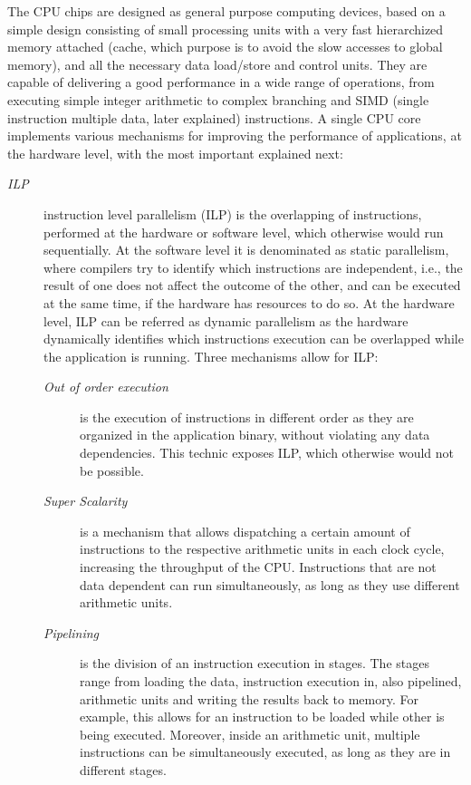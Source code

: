 The CPU chips are designed as general purpose computing devices, based on a simple design consisting of small processing units with a very fast hierarchized memory attached (cache, which purpose is to avoid the slow accesses to global memory), and all the necessary data load/store and control units. They are capable of delivering a good performance in a wide range of operations, from executing simple integer arithmetic to complex branching and SIMD (single instruction multiple data, later explained) instructions. A single CPU core implements various mechanisms for improving the performance of applications, at the hardware level, with the most important explained next:

\begin{description}
	\item[\textit{ILP}] instruction level parallelism (ILP) is the overlapping of instructions, performed at the hardware or software level, which otherwise would run sequentially. At the software level it is denominated as static parallelism, where compilers try to identify which instructions are independent, i.e., the result of one does not affect the outcome of the other, and can be executed at the same time, if the hardware has resources to do so. At the hardware level, ILP can be referred as dynamic parallelism as the hardware dynamically identifies which instructions execution can be overlapped while the application is running. Three mechanisms allow for ILP:
	\begin{description}
		\item[\textit{Out of order execution}] is the execution of instructions in different order as they are organized in the application binary, without violating any data dependencies. This technic exposes ILP, which otherwise would not be possible.
		\item[\textit{Super Scalarity}] is a mechanism that allows dispatching a certain amount of instructions to the respective arithmetic units in each clock cycle, increasing the throughput of the CPU. Instructions that are not data dependent can run simultaneously, as long as they use different arithmetic units.
		\item[\textit{Pipelining}] is the division of an instruction execution in stages. The stages range from loading the data, instruction execution in, also pipelined, arithmetic units and writing the results back to memory. For example, this allows for an instruction to be loaded while other is being executed. Moreover, inside an arithmetic unit, multiple instructions can be simultaneously executed, as long as they are in different stages.

\end{description}
\end{description}
